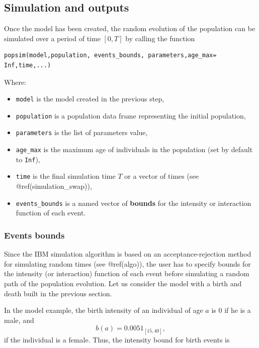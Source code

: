 \hypertarget{simulation}{%
\subsection{Simulation and outputs}\label{simulation}}

Once the model has been created, the random evolution of the population can be simulated over a period of time \([0,T]\) by calling the function

\begin{verbatim}
popsim(model,population, events_bounds, parameters,age_max= Inf,time,...)
\end{verbatim}

Where:

\begin{itemize}
\tightlist
\item
  \texttt{model} is the model created in the previous step,
\item
  \texttt{population} is a population data frame representing the initial population,
\item
  \texttt{parameters} is the list of parameters value,
\item
  \texttt{age\_max} is the maximum age of individuals in the population (set by default to \texttt{Inf}),
\item
  \texttt{time} is the final simulation time \(T\) or a vector of times (see @ref(simulation\_swap)),
\item
  \texttt{events\_bounds} is a named vector of \textbf{bounds} for the intensity or interaction function of each event.
\end{itemize}

\hypertarget{events-bounds}{%
\subsubsection{Events bounds}\label{events-bounds}}

Since the IBM simulation algorithm is based on an acceptance-rejection method for simulating random times (see @ref(algo)), the user has to specify bounds for the intensity (or interaction) function of each event before simulating a random path of the population evolution. Let us consider the model with a birth and death built in the previous section.

In the model example, the birth intensity of an individual of age \(a\) is \(0\) if he is a male, and
\[ b(a) = 0.005  1_{[15,40]},\]
if the individual is a female. Thus, the intensity bound for birth events is

